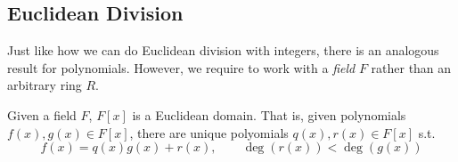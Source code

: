 \subsection{Euclidean Division} 

  Just like how we can do Euclidean division with integers, there is an analogous result for polynomials. However, we require to work with a \textit{field} $F$ rather than an arbitrary ring $R$. 

  \begin{theorem}
    Given a field $F$, $F[x]$ is a Euclidean domain. That is, given polynomials $f(x), g(x) \in F[x]$, there are unique polyomials $q(x), r(x) \in F[x]$ s.t. 
    \begin{equation}
      f(x) = q(x) g(x) + r(x), \qquad \deg(r(x)) < \deg(g(x))
    \end{equation} 
  \end{theorem} 
